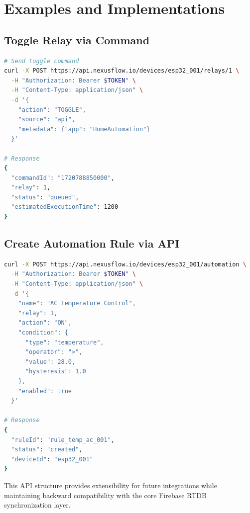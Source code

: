 \section{Examples and Implementations}

\subsection{Toggle Relay via Command}

\begin{lstlisting}[language=bash, caption=Toggle Relay Curl Example, label=lst:toggle_relay_curl]
# Send toggle command
curl -X POST https://api.nexusflow.io/devices/esp32_001/relays/1 \
  -H "Authorization: Bearer $TOKEN" \
  -H "Content-Type: application/json" \
  -d '{
    "action": "TOGGLE",
    "source": "api",
    "metadata": {"app": "HomeAutomation"}
  }'

# Response
{
  "commandId": "1720788850000",
  "relay": 1,
  "status": "queued",
  "estimatedExecutionTime": 1200
}
\end{lstlisting}

\subsection{Create Automation Rule via API}

\begin{lstlisting}[language=bash, caption=Create Automation Rule, label=lst:create_rule_api]
curl -X POST https://api.nexusflow.io/devices/esp32_001/automation \
  -H "Authorization: Bearer $TOKEN" \
  -H "Content-Type: application/json" \
  -d '{
    "name": "AC Temperature Control",
    "relay": 1,
    "action": "ON",
    "condition": {
      "type": "temperature",
      "operator": ">",
      "value": 28.0,
      "hysteresis": 1.0
    },
    "enabled": true
  }'

# Response
{
  "ruleId": "rule_temp_ac_001",
  "status": "created",
  "deviceId": "esp32_001"
}
\end{lstlisting}

This API structure provides extensibility for future integrations while maintaining backward compatibility with the core Firebase RTDB synchronization layer.
